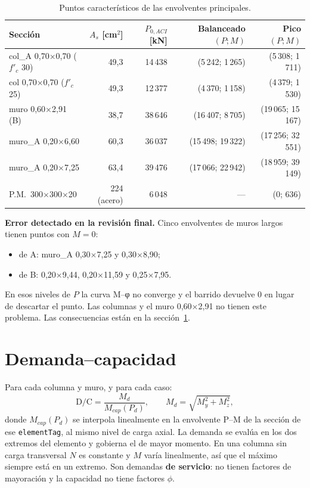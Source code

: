 \documentclass[11pt,a4paper]{article}
\begin{document}
\begin{table}[h]
\centering
\caption{Puntos característicos de las envolventes principales.}
\begin{tabular}{lrrrr}
\toprule
Sección & $A_s$ [cm$^2$] & $P_{0,ACI}$ [kN] & Balanceado $(P; M)$ & Pico $(P; M)$ \\
\midrule
col\_A 0,70$\times$0,70 ($f'_c$ 30) & 49,3 & 14\,438 & (5\,242; 1\,265) & (5\,308; 1\,711) \\
col 0,70$\times$0,70 ($f'_c$ 25) & 49,3 & 12\,377 & (4\,370; 1\,158) & (4\,379; 1\,530) \\
muro 0,60$\times$2,91 (B) & 38,7 & 38\,646 & (16\,407; 8\,705) & (19\,065; 15\,167) \\
muro\_A 0,20$\times$6,60 & 60,3 & 36\,037 & (15\,498; 19\,322) & (17\,256; 32\,551) \\
muro\_A 0,20$\times$7,25 & 63,4 & 39\,476 & (17\,066; 22\,942) & (18\,959; 39\,149) \\
P.M.~300$\times$300$\times$20 & 224 (acero) & 6\,048 & --- & (0; 636) \\
\bottomrule
\end{tabular}
\end{table}

\textbf{Error detectado en la revisión final.} Cinco envolventes de muros
largos tienen puntos con $M = 0$:
\begin{itemize}
  \item de A: muro\_A 0,30$\times$7,25 y 0,30$\times$8,90;
  \item de B: 0,20$\times$9,44, 0,20$\times$11,59 y 0,25$\times$7,95.
\end{itemize}
En esos niveles de $P$ la curva M--φ no converge y el barrido devuelve 0 en
lugar de descartar el punto. Las columnas y el muro 0,60$\times$2,91 no tienen
este problema. Las consecuencias están en la sección~\ref{sec:dc}.

\section{Demanda--capacidad}\label{sec:dc}

Para cada columna y muro, y para cada caso:
\[
\text{D/C} = \frac{M_d}{M_{cap}(P_d)}, \qquad M_d = \sqrt{M_y^2 + M_z^2},
\]
donde $M_{cap}(P_d)$ se interpola linealmente en la envolvente P--M de la
sección de ese \texttt{elementTag}, al mismo nivel de carga axial. La demanda se
evalúa en los dos extremos del elemento y gobierna el de mayor momento. En una
columna sin carga transversal $N$ es constante y $M$ varía linealmente, así que
el máximo siempre está en un extremo. Son demandas \textbf{de servicio}: no
tienen factores de mayoración y la capacidad no tiene factores $\phi$.
\end{document}
